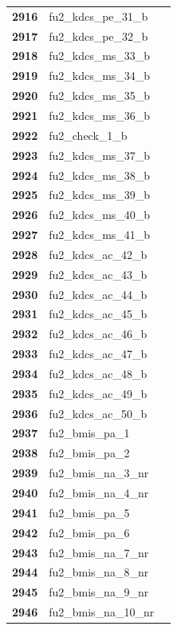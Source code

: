 \documentclass[
  letterpaper,
  DIV=11,
  numbers=noendperiod]{scrartcl}
\begin{document}
\begin{longtable}[t]{>{}cll}
\addlinespace
\textbf{2916} & fu2\_kdcs\_pe\_31\_b & \\
\textbf{2917} & fu2\_kdcs\_pe\_32\_b & \\
\textbf{2918} & fu2\_kdcs\_ms\_33\_b & \\
\textbf{2919} & fu2\_kdcs\_ms\_34\_b & \\
\textbf{2920} & fu2\_kdcs\_ms\_35\_b & \\
\addlinespace
\textbf{2921} & fu2\_kdcs\_ms\_36\_b & \\
\textbf{2922} & fu2\_check\_1\_b & \\
\textbf{2923} & fu2\_kdcs\_ms\_37\_b & \\
\textbf{2924} & fu2\_kdcs\_ms\_38\_b & \\
\textbf{2925} & fu2\_kdcs\_ms\_39\_b & \\
\addlinespace
\textbf{2926} & fu2\_kdcs\_ms\_40\_b & \\
\textbf{2927} & fu2\_kdcs\_ms\_41\_b & \\
\textbf{2928} & fu2\_kdcs\_ac\_42\_b & \\
\textbf{2929} & fu2\_kdcs\_ac\_43\_b & \\
\textbf{2930} & fu2\_kdcs\_ac\_44\_b & \\
\addlinespace
\textbf{2931} & fu2\_kdcs\_ac\_45\_b & \\
\textbf{2932} & fu2\_kdcs\_ac\_46\_b & \\
\textbf{2933} & fu2\_kdcs\_ac\_47\_b & \\
\textbf{2934} & fu2\_kdcs\_ac\_48\_b & \\
\textbf{2935} & fu2\_kdcs\_ac\_49\_b & \\
\addlinespace
\textbf{2936} & fu2\_kdcs\_ac\_50\_b & \\
\textbf{2937} & fu2\_bmis\_pa\_1 & \\
\textbf{2938} & fu2\_bmis\_pa\_2 & \\
\textbf{2939} & fu2\_bmis\_na\_3\_nr & \\
\textbf{2940} & fu2\_bmis\_na\_4\_nr & \\
\addlinespace
\textbf{2941} & fu2\_bmis\_pa\_5 & \\
\textbf{2942} & fu2\_bmis\_pa\_6 & \\
\textbf{2943} & fu2\_bmis\_na\_7\_nr & \\
\textbf{2944} & fu2\_bmis\_na\_8\_nr & \\
\textbf{2945} & fu2\_bmis\_na\_9\_nr & \\
\addlinespace
\textbf{2946} & fu2\_bmis\_na\_10\_nr & \\

\end{longtable}
\end{document}

